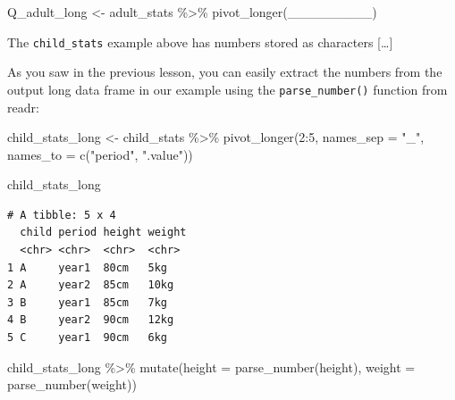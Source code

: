 \documentclass[
  letterpaper,
  DIV=11,
  numbers=noendperiod]{scrreprt}
\newenvironment{Shaded}{\begin{snugshade}}{\end{snugshade}}
\newcommand{\AttributeTok}[1]{\textcolor[rgb]{0.40,0.45,0.13}{#1}}
\newcommand{\DecValTok}[1]{\textcolor[rgb]{0.68,0.00,0.00}{#1}}
\newcommand{\FunctionTok}[1]{\textcolor[rgb]{0.28,0.35,0.67}{#1}}
\newcommand{\NormalTok}[1]{\textcolor[rgb]{0.00,0.23,0.31}{#1}}
\newcommand{\OtherTok}[1]{\textcolor[rgb]{0.00,0.23,0.31}{#1}}
\newcommand{\SpecialCharTok}[1]{\textcolor[rgb]{0.37,0.37,0.37}{#1}}
\newcommand{\StringTok}[1]{\textcolor[rgb]{0.13,0.47,0.30}{#1}}
\begin{document}
\begin{tcolorbox}
\begin{Shaded}
\begin{Highlighting}[]
\NormalTok{Q\_adult\_long }\OtherTok{\textless{}{-}}
\NormalTok{  adult\_stats }\SpecialCharTok{\%\textgreater{}\%}
  \FunctionTok{pivot\_longer}\NormalTok{(\_\_\_\_\_\_\_\_\_)}
\end{Highlighting}
\end{Shaded}

\end{tcolorbox}

\begin{tcolorbox}[enhanced jigsaw, colframe=quarto-callout-note-color-frame, rightrule=.15mm, opacityback=0, breakable, coltitle=black, colbacktitle=quarto-callout-note-color!10!white, bottomrule=.15mm, leftrule=.75mm, toprule=.15mm, arc=.35mm, bottomtitle=1mm, colback=white, left=2mm, opacitybacktitle=0.6, titlerule=0mm, title=\textcolor{quarto-callout-note-color}{\faInfo}\hspace{0.5em}{Side Note}, toptitle=1mm]

The \texttt{child\_stats} example above has numbers stored as characters
{[}\ldots{]}

As you saw in the previous lesson, you can easily extract the numbers
from the output long data frame in our example using the
\texttt{parse\_number()} function from readr:

\begin{Shaded}
\begin{Highlighting}[]
\NormalTok{child\_stats\_long }\OtherTok{\textless{}{-}} 
\NormalTok{  child\_stats }\SpecialCharTok{\%\textgreater{}\%} 
  \FunctionTok{pivot\_longer}\NormalTok{(}\DecValTok{2}\SpecialCharTok{:}\DecValTok{5}\NormalTok{, }
               \AttributeTok{names\_sep =} \StringTok{"\_"}\NormalTok{,}
               \AttributeTok{names\_to =} \FunctionTok{c}\NormalTok{(}\StringTok{"period"}\NormalTok{, }\StringTok{".value"}\NormalTok{))}

\NormalTok{child\_stats\_long}
\end{Highlighting}
\end{Shaded}

\begin{verbatim}
# A tibble: 5 x 4
  child period height weight
  <chr> <chr>  <chr>  <chr> 
1 A     year1  80cm   5kg   
2 A     year2  85cm   10kg  
3 B     year1  85cm   7kg   
4 B     year2  90cm   12kg  
5 C     year1  90cm   6kg   
\end{verbatim}

\begin{Shaded}
\begin{Highlighting}[]
\NormalTok{child\_stats\_long }\SpecialCharTok{\%\textgreater{}\%} 
  \FunctionTok{mutate}\NormalTok{(}\AttributeTok{height =} \FunctionTok{parse\_number}\NormalTok{(height), }
         \AttributeTok{weight =} \FunctionTok{parse\_number}\NormalTok{(weight))}
\end{Highlighting}
\end{Shaded}


\end{tcolorbox}
\end{document}
